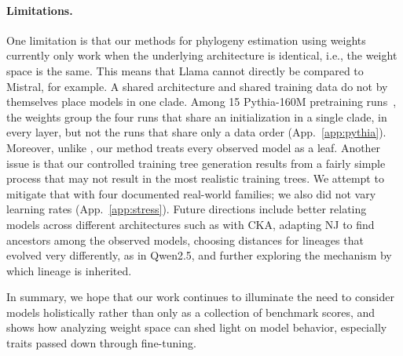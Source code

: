 \documentclass{article}
\theoremstyle{definition}
\theoremstyle{plain}
\newif\ifrevision
\newcommand{\rev}[1]{\ifrevision{\color{blue}#1}\else#1\fi}
\newcommand{\revtag}[1]{\ifrevision\textsuperscript{\color{blue}\sffamily\scriptsize[#1]}\fi}
\begin{document}
\paragraph{Limitations.} One limitation is that our methods for phylogeny estimation using weights currently only work when the underlying architecture is identical, i.e., the weight space is the same.  This means that Llama cannot directly be compared to Mistral, for example. \rev{A shared architecture and shared training data do not by themselves place models in one clade. Among 15 Pythia-160M pretraining runs~\citep{vanderwal2025polypythias}, the weights group the four runs that share an initialization in a single clade, in every layer, but not the runs that share only a data order (App.~\ref{app:pythia}).}\revtag{qfLP} Moreover, unlike \citet{horwitz2025mother}, our method treats every observed model as a leaf. Another issue is that our controlled training tree generation results from a fairly simple process that may not result in the most realistic training trees.  We attempt to mitigate that with \rev{four}\revtag{S8sV} documented real-world families\rev{; we also did not vary learning rates (App.~\ref{app:stress})}\revtag{S8sV Q2}. Future directions include better relating models across different architectures such as with CKA\rev{, adapting NJ to find ancestors among the observed models,}\revtag{FgwB} \rev{choosing distances for lineages that evolved very differently, as in Qwen2.5,}\revtag{S8sV} and further exploring the mechanism by which lineage is inherited.

In summary, we hope that our work continues to illuminate the need to consider models holistically rather than only as a collection of benchmark scores, and shows how analyzing weight space can shed light on model behavior, especially traits passed down through fine-tuning.


\end{document}

